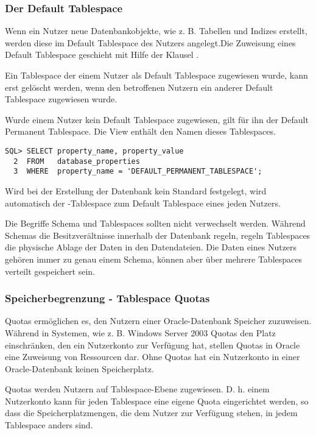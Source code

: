         \subsubsection{Der Default Tablespace}
          Wenn ein Nutzer neue Datenbankobjekte, wie z. B. Tabellen und Indizes erstellt, werden diese im Default Tablespace des Nutzers angelegt.Die Zuweisung eines Default Tablespace geschieht mit Hilfe der Klausel .
          \begin{merke}
            Ein Tablespace der einem Nutzer als Default Tablespace zugewiesen wurde, kann erst gelöscht werden, wenn den betroffenen Nutzern ein anderer Default Tablespace zugewiesen wurde.
          \end{merke}
          Wurde einem Nutzer kein Default Tablespace zugewiesen, gilt für ihn der Default Permanent Tablespace. Die View  enthält den Namen dieses Tablespaces.
          \begin{lstlisting}[caption={Der Default Permanent
          Tablespace},label=admin201,language=oracle_sql]
SQL> SELECT property_name, property_value
  2  FROM   database_properties
  3  WHERE  property_name = 'DEFAULT_PERMANENT_TABLESPACE';
          \end{lstlisting}
          \begin{merke}
            Wird bei der Erstellung der Datenbank kein Standard festgelegt, wird automatisch der -Tablespace zum Default Tablespace eines jeden Nutzers.
          \end{merke}
          Die Begriffe Schema und Tablespaces sollten nicht verwechselt werden. Während Schemas die Besitzverältnisse innerhalb der Datenbank regeln, regeln Tablespaces die physische Ablage der Daten in den Datendateien. Die Daten eines Nutzers gehören immer zu genau einem Schema, können aber über mehrere Tablespaces verteilt gespeichert sein.
        \subsubsection{Speicherbegrenzung - Tablespace Quotas}
          Quotas ermöglichen es, den Nutzern einer Oracle-Datenbank Speicher zuzuweisen. Während in Systemen, wie z. B. Windows Server 2003 Quotas den Platz einschränken, den ein Nutzerkonto zur Verfügung hat, stellen Quotas in Oracle eine Zuweisung von Ressourcen dar. Ohne Quotas hat ein Nutzerkonto in einer Oracle-Datenbank keinen Speicherplatz.

          Quotas werden Nutzern auf Tablespace-Ebene zugewiesen. D. h. einem Nutzerkonto kann für jeden Tablespace eine eigene Quota eingerichtet werden, so dass die Speicherplatzmengen, die dem Nutzer zur Verfügung stehen, in jedem Tablespace anders sind.

